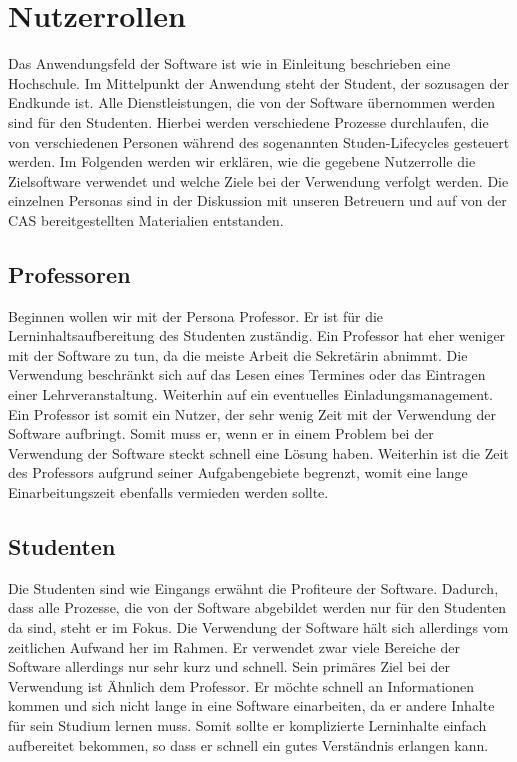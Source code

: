 \section{Nutzerrollen}
Das Anwendungsfeld der Software ist wie in Einleitung beschrieben eine Hochschule. Im Mittelpunkt der Anwendung steht der Student, der sozusagen der Endkunde ist. Alle Dienstleistungen, die von der Software übernommen werden sind für den Studenten. Hierbei werden verschiedene Prozesse durchlaufen, die von verschiedenen Personen während des sogenannten Studen-Lifecycles gesteuert werden. Im Folgenden werden wir erklären, wie die gegebene Nutzerrolle die Zielsoftware verwendet und welche Ziele bei der Verwendung verfolgt werden. Die einzelnen Personas sind in der Diskussion mit unseren Betreuern und auf von der CAS bereitgestellten Materialien entstanden.

\subsection{Professoren}
Beginnen wollen wir mit der Persona Professor. Er ist für die Lerninhaltsaufbereitung des Studenten zuständig. Ein Professor hat eher weniger mit der Software zu tun, da die meiste Arbeit die Sekretärin abnimmt. Die Verwendung beschränkt sich auf das Lesen eines Termines oder das Eintragen einer Lehrveranstaltung. Weiterhin auf ein eventuelles Einladungsmanagement. Ein Professor ist somit ein Nutzer, der sehr wenig Zeit mit der Verwendung der Software aufbringt. Somit muss er, wenn er in einem Problem bei der Verwendung der Software steckt schnell eine Lösung haben. Weiterhin ist die Zeit des Professors aufgrund seiner Aufgabengebiete begrenzt, womit eine lange Einarbeitungszeit ebenfalls vermieden werden sollte.

\subsection{Studenten}
Die Studenten sind wie Eingangs erwähnt die Profiteure der Software. Dadurch, dass alle Prozesse, die von der Software abgebildet werden nur für den Studenten da sind, steht er im Fokus. Die Verwendung der Software hält sich allerdings vom zeitlichen Aufwand her im Rahmen. Er verwendet zwar viele Bereiche der Software allerdings nur sehr kurz und schnell. Sein primäres Ziel bei der Verwendung ist Ähnlich dem Professor. Er möchte schnell an Informationen kommen und sich nicht lange in eine Software einarbeiten, da er andere Inhalte für sein Studium lernen muss. Somit sollte er komplizierte Lerninhalte einfach aufbereitet bekommen, so dass er schnell ein gutes Verständnis erlangen kann.

